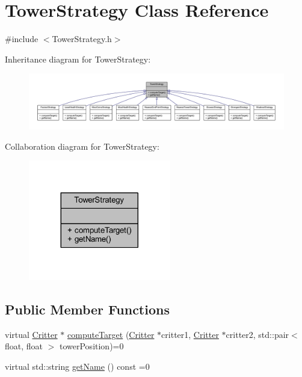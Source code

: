 \hypertarget{class_tower_strategy}{\section{Tower\+Strategy Class Reference}
\label{class_tower_strategy}
}


{\ttfamily \#include $<$Tower\+Strategy.\+h$>$}



Inheritance diagram for Tower\+Strategy\+:\nopagebreak
\begin{figure}[H]
\begin{center}
\leavevmode
\includegraphics[width=350pt]{class_tower_strategy__inherit__graph}
\end{center}
\end{figure}


Collaboration diagram for Tower\+Strategy\+:\nopagebreak
\begin{figure}[H]
\begin{center}
\leavevmode
\includegraphics[width=176pt]{class_tower_strategy__coll__graph}
\end{center}
\end{figure}
\subsection*{Public Member Functions}
\begin{DoxyCompactItemize}
\item 
virtual \hyperlink{class_critter}{Critter} $\ast$ \hyperlink{class_tower_strategy_a5cb933a2467f3a99c153049d01e0e246}{compute\+Target} (\hyperlink{class_critter}{Critter} $\ast$critter1, \hyperlink{class_critter}{Critter} $\ast$critter2, std\+::pair$<$ float, float $>$ tower\+Position)=0
\item 
virtual std\+::string \hyperlink{class_tower_strategy_a6cf0bf6f2cd94a9f383bc316c6baa922}{get\+Name} () const =0
\end{DoxyCompactItemize}


